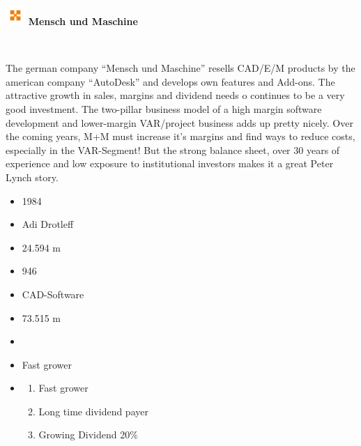 \documentclass[11pt]{scrartcl}
\begin{document}



\begin{minipage}{\textwidth}
    \center\includegraphics[width=2em]{company_logo.png}
    {\textbf{Mensch und Maschine}}
\end{minipage}\\




\begin{minipage}[t]{0,72\linewidth}
    The german company \enquote{Mensch und Maschine} resells CAD/E/M
    products by the american company \enquote{AutoDesk} and develops
    own features and Add-ons. The attractive growth in sales, margins
    and dividend needs o continues to be a very good investment. The
    two-pillar business model of a high margin software development and
    lower-margin VAR/project business adds up pretty nicely. Over the
    coming years, M+M must increase it's margins and find ways to reduce
    costs, especially in the VAR-Segment! But the strong balance sheet,
    over 30 years of experience and low exposure to institutional investors
    makes it a great Peter Lynch story.
\end{minipage}\hfill
\begin{minipage}[t]{0,25\linewidth}
    \begin{itemize}[align=left, leftmargin=0pt, listparindent=\parindent, labelwidth=1cm, itemindent=!]\scriptsize
        \item [\faAsterisk] 1984
        \item [\faMale] Adi Drotleff
        \item [\faEuro] \faEuro \num{24.594} m
        \item [\faUsers] \num{946}
        \item [\faIndustry] CAD-Software
        \item [\faBook] \faEuro \num{73,515} m
        \item [\reflectbox{\rotatebox[origin=c]{270}{\faLevelDown}}] \faEuro
        \item [\faFolderOpen]Fast grower
        \item [\faQuestion]
        \begin{enumerate}[align=left, leftmargin=2cm]
            \item Fast grower
            \item Long time dividend payer
            \item Growing Dividend 20\%
        \end{enumerate}
    \end{itemize}
\end{minipage}\\\\
\end{document}
